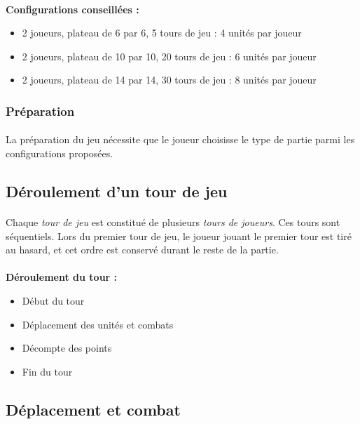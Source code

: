 \documentclass[a4paper]{article}
\begin{document}
\paragraph{}
\textbf{Configurations conseillées : }
\begin{itemize}
    \item 2 joueurs, plateau de 6 par 6, 5 tours de jeu : 4 unités par joueur
    \item 2 joueurs, plateau de 10 par 10, 20 tours de jeu : 6 unités par joueur
    \item 2 joueurs, plateau de 14 par 14, 30 tours de jeu : 8 unités par joueur
\end{itemize}

\subsubsection{Préparation}
\paragraph{}
La préparation du jeu nécessite que le joueur choisisse le type de partie parmi les configurations proposées. 

\subsection{Déroulement d'un tour de jeu}
\paragraph{}
Chaque \textit{tour de jeu} est constitué de plusieurs \textit{tours de joueurs}. Ces tours sont séquentiels. Lors du premier tour de jeu, le joueur jouant le premier tour est tiré au hasard, et cet ordre est conservé durant le reste de la partie.

\paragraph{}
\textbf{Déroulement du tour : }
\begin{itemize}
    \item Début du tour
    \item Déplacement des unités et combats
    \item Décompte des points
    \item Fin du tour
\end{itemize}

\subsection{Déplacement et combat}
\end{document}
